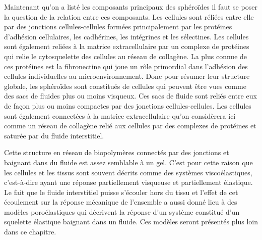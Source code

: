  Maintenant qu'on a listé les composants principaux des sphéroïdes il faut se poser la question de la relation entre ces composants. Les cellules sont réliées entre elle par des jonctions cellules-cellules formées principalement par les protéines d'adhésion cellulaires, les cadhérines, les intégrines et les sélectines.\cite{Alberts2002} Les cellules sont également reliées à la matrice extracellulaire par un complexe de protéines qui relie le cytosquelette des cellules au réseau de collagène. La plus connue de ces protéines est la fibronectine qui joue un rôle primordial dans l'adhésion des cellules individuelles au microenvironnement. Donc pour résumer leur structure globale, les sphéroïdes sont constitués de cellules qui peuvent être vues comme des sacs de fluides plus ou moins visqueux. Ces sacs de fluide sont reliés entre eux de façon plus ou moins compactes par des jonctions cellules-cellules. Les cellules sont également connectées à la matrice extracellulaire qu'on considèrera ici comme un réseau de collagène relié aux cellules par des complexes de protéines et saturée par du fluide interstitiel.
 
 Cette structure en réseau de biopolymères connectés par des jonctions et baignant dans du fluide est assez semblable à un gel. C'est pour cette raison que les cellules et les tissus sont souvent décrits comme des systèmes viscoélastiques, c'est-à-dire ayant une réponse partiellement visqueuse et partiellement élastique. Le fait que le fluide interstitiel puisse s'écouler hors du tissu et l'effet de cet écoulement sur la réponse mécanique de l'ensemble a aussi donné lieu à des modèles poroélastiques qui décrivent la réponse d'un système constitué d'un squelette élastique baignant dans un fluide. Ces modèles seront présentés plus loin dans ce chapitre.

